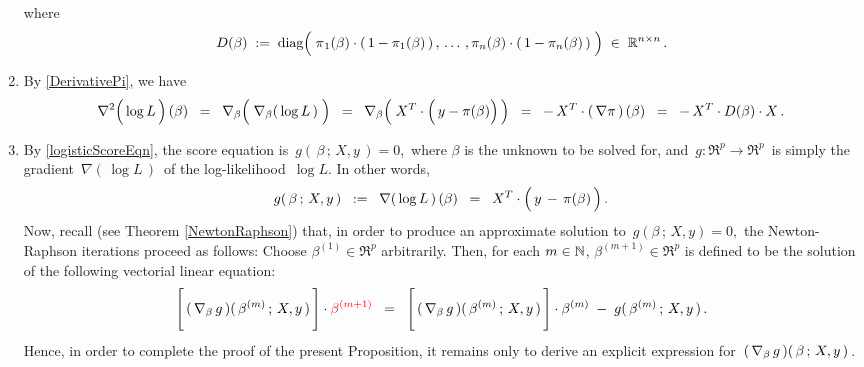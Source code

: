 \begin{enumerate}
\begin{equation*}
	\end{equation*}
	where
	\begin{equation*}
	D(\beta) \; := \; \diag\!\left(\;
		\overset{{\color{white}-}}{\pi}_{1}(\beta) \cdot (\,1-\pi_{1}(\beta)\,)\,,
		\,\ldots\,,
		\pi_{n}(\beta) \cdot (\,1-\pi_{n}(\beta)\,)
		\;\right)
		\;\in\;
		\Re^{n \times n}\,.
	\end{equation*}
\item
	By \eqref{DerivativePi}, we have
	\begin{equation*}
	\nabla^{2}\!\left(\,\overset{{\color{white}.}}{\log}\,L\,\right)(\beta)
	\;\; = \;\;
		\nabla_{\beta}\!\left(\;\overset{{\color{white}.}}{\nabla}_{\beta}\!\left(\,\log L\,\right)\;\right)
	\;\; = \;\;
		\nabla_{\beta}\!\left(\;X^{T}\cdot\left(\,y \overset{{\color{white}.}}{-} \pi(\beta)\right) \,\right)
	\;\; = \;\;
		-\, X^{T} \cdot \left(\,\nabla\pi\,\right)(\beta)
	\;\; = \;\;
		-\, X^{T} \cdot D(\beta) \cdot X\,.
	\end{equation*}
\item
	By \eqref{logisticScoreEqn}, the score equation is
	\,$g(\,\beta\,;\,X,y\,) = 0$,\,
	where $\beta$ is the unknown to be solved for, and
	\,$g : \Re^{p} \longrightarrow \Re^{p}$\,
	is simply the gradient
	\,$\nabla\!\left(\,\log L\,\right)$\,
	of the log-likelihood
	\,$\log L$.
	In other words,
	\begin{equation*}
	g\!\left(\,\beta\,;\,X,y\,\right)
	\;\; := \;\;
		\nabla\!\left(\,\log L\,\right)(\beta)
	\;\; = \;\;
		X^{T} \cdot \left(\,y \,\overset{{\color{white}.}}{-}\, \pi(\beta)\,\right).
	\end{equation*}
	Now, recall (see Theorem \eqref{NewtonRaphson}) that,
	in order to produce an approximate solution to
	\,$g(\beta\,;\,X,y) = 0$,\,
	the Newton-Raphson iterations proceed as follows:
	Choose $\beta^{(1)} \in \Re^{p}$ arbitrarily.
	Then, for each $m \in \mathbb{N}$, $\beta^{(m+1)} \in \Re^{p}$
	is defined to be the solution of the following vectorial linear equation:
	\begin{equation}\label{nablaGBetaMPlusOne}
	\left[\,(\,\overset{{\color{white}\vert}}{\nabla}_{\beta}\,g\,)(\,\beta^{(m)}\,;\,X,y\,)\,\right] \cdot {\color{red}\beta^{(m+1)}}
	\;\; = \;\;
		\left[\,(\,\overset{{\color{white}\vert}}{\nabla}_{\beta}\,g\,)(\,\beta^{(m)}\,;\,X,y\,)\,\right] \cdot \beta^{(m)}
		\; - \;
		g(\,\beta^{(m)}\,;\,X,y\,)\,.
	\end{equation}
	Hence, in order to complete the proof of the present Proposition,
	it remains only to derive an explicit expression for
	\,$(\,\overset{{\color{white}.}}{\nabla}_{\beta}\,g\,)(\,\beta\,;\,X,y\,)$\,.

\end{enumerate}
